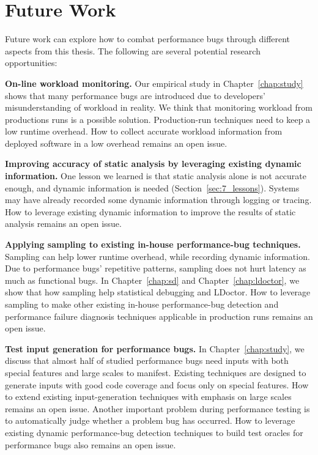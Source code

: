 \section{Future Work}
\label{sec:7_future}

Future work can explore how to combat performance bugs through different aspects from this thesis. 
The following are several potential research opportunities:



{\bf On-line workload monitoring.} 
Our empirical study in Chapter~\ref{chap:study} 
shows that many performance bugs are introduced due to developers' misunderstanding of workload in reality. 
We think that monitoring workload from productions runs is a possible solution. 
Production-run techniques need to keep a low runtime overhead.
How to collect accurate workload information from deployed software in a low overhead remains an open issue. 

{\bf Improving accuracy of static analysis by leveraging existing dynamic information.}
One lesson we learned is that static analysis alone is not accurate enough, 
and dynamic information is needed (Section~\ref{sec:7_lessons}). 
Systems may have already recorded some dynamic information through logging or tracing.
How to leverage existing dynamic information to improve the results of static analysis remains an open issue. 

{\bf Applying sampling to existing in-house performance-bug techniques.}
Sampling can help lower runtime overhead, while recording dynamic information. 
Due to performance bugs' repetitive patterns, 
sampling does not hurt latency as much as functional bugs. 
In Chapter~\ref{chap:sd} and Chapter~\ref{chap:ldoctor}, 
we show that how sampling help statistical debugging and LDoctor. 
How to leverage sampling to make other existing in-house performance-bug detection 
and performance failure diagnosis techniques applicable in production runs remains an open issue. 


{\bf Test input generation for performance bugs.}
In Chapter~\ref{chap:study}, 
we discuss that almost half of studied performance bugs need inputs with both special features and large scales to manifest. 
Existing techniques are designed to generate inputs with good code coverage and focus only on special features.
How to extend existing input-generation techniques with emphasis on large scales remains an open issue. 
Another important problem during performance testing is to automatically judge whether a problem bug has occurred. 
How to leverage existing dynamic performance-bug detection techniques to build test oracles for performance bugs also remains an open issue.  


